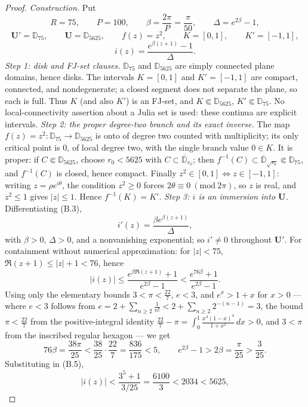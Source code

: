 \documentclass[11pt,reqno]{amsart}
\theoremstyle{definition}
\theoremstyle{remark}
\begin{document}
\begin{proof}
\emph{Construction.} Put
\[ R=75,\qquad P=100,\qquad \beta=\frac{2\pi}{P}=\frac{\pi}{50},\qquad \Delta=e^{2\beta}-1, \tag{B.1} \]
\[ \mathbf U'=\mathbb D_{75},\qquad \mathbf U=\mathbb D_{5625},\qquad f(z)=z^2,\qquad K=[0,1],\qquad K'=[-1,1], \tag{B.2} \]
\[ i(z)=\frac{e^{\beta(z+1)}-1}{\Delta}. \tag{B.3} \]
\emph{Step 1: disk and FJ-set clauses.} \(\mathbb D_{75}\) and \(\mathbb D_{5625}\) are simply connected plane domains, hence disks. The intervals \(K=[0,1]\) and \(K'=[-1,1]\) are compact, connected, and nondegenerate; a closed segment does not separate the plane, so each is full. Thus \(K\) (and also \(K'\)) is an FJ-set, and \(K\Subset\mathbb D_{5625}\), \(K'\Subset\mathbb D_{75}\). No local-connectivity assertion about a Julia set is used: these continua are explicit intervals.
\emph{Step 2: the proper degree-two branch and its exact inverse.} The map \(f(z)=z^2:\mathbb D_{75}\to\mathbb D_{5625}\) is onto of degree two counted with multiplicity; its only critical point is \(0\), of local degree two, with the single branch value \(0\in K\). It is proper: if \(C\Subset\mathbb D_{5625}\), choose \(r_0<5625\) with \(C\subset\overline{\mathbb D}_{r_0}\); then \(f^{-1}(C)\subset\overline{\mathbb D}_{\sqrt{r_0}}\Subset\mathbb D_{75}\), and \(f^{-1}(C)\) is closed, hence compact. Finally \(z^2\in[0,1]\iff z\in[-1,1]\): writing \(z=\rho e^{i\theta}\), the condition \(z^2\ge0\) forces \(2\theta\equiv0\ (\mathrm{mod}\ 2\pi)\), so \(z\) is real, and \(z^2\le1\) gives \(|z|\le1\). Hence \(f^{-1}(K)=K'\).
\emph{Step 3: \(i\) is an immersion into \(\mathbf U\).} Differentiating (B.3),
\[ i'(z)=\frac{\beta e^{\beta(z+1)}}{\Delta}, \tag{B.4} \]
with \(\beta>0\), \(\Delta>0\), and a nonvanishing exponential; so \(i'\ne0\) throughout \(\mathbf U'\). For containment without numerical approximation: for \(|z|<75\), \(\Re(z+1)\le|z|+1<76\), hence
\[ |i(z)|\le\frac{e^{\beta\Re(z+1)}+1}{e^{2\beta}-1}<\frac{e^{76\beta}+1}{e^{2\beta}-1}. \tag{B.5} \]
Using only the elementary bounds \(3<\pi<\tfrac{22}{7}\), \(e<3\), and \(e^{x}>1+x\) for \(x>0\) — where \(e<3\) follows from \(e=2+\sum_{n\ge2}\tfrac1{n!}<2+\sum_{n\ge2}2^{-(n-1)}=3\), the bound \(\pi<\tfrac{22}{7}\) from the positive-integral identity \(\tfrac{22}{7}-\pi=\int_0^1\tfrac{x^4(1-x)^4}{1+x^2}\,dx>0\), and \(3<\pi\) from the inscribed regular hexagon — we get
\[ 76\beta=\frac{38\pi}{25}<\frac{38}{25}\cdot\frac{22}{7}=\frac{836}{175}<5,\qquad e^{2\beta}-1>2\beta=\frac{\pi}{25}>\frac{3}{25}. \]
Substituting in (B.5),
\[ |i(z)|<\frac{3^{5}+1}{3/25}=\frac{6100}{3}<2034<5625, \]

\end{proof}
\end{document}
